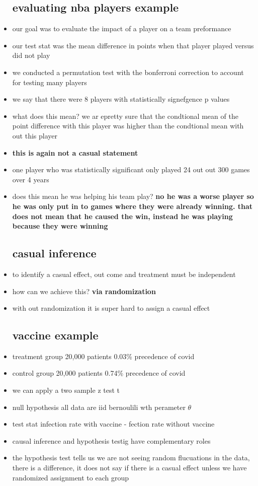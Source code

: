 \documentclass{article}
\begin{document}
\begin{itemize}
\subsection*{evaluating nba players example}
\item our goal was to evaluate the impact of a player on a team preformance
\item our test stat was the mean difference in points when that player played versus did not play 
\item we conducted a permutation test with the bonferroni correction to account for testing many players
\item we say that there were 8 players with statistically signefgence p values
\item what does this mean? we ar epretty sure that the condtional mean of the point difference with this player was higher than the condtional mean with out this player
\item \textbf{this is again not a casual statement}
\item one player  who was statistically significant  only played 24 out out 300 games over 4 years 
\item does this mean he was helping his team play? \textbf{no he was a worse player so he was only put in to games where they were already winning. that does not mean that he caused the win, instead he was playing because they were winning  
}
\subsection*{casual inference
}
\item to identify a casual effect, out come and treatment must be independent
\item how can we achieve this? \textbf{via randomization}
\item with out randomization it is super hard to assign a casual effect 

\subsection*{vaccine example}
\item treatment group 20,000 patients 0.03\% precedence of covid 
\item control group 20,000 patients 0.74\% precedence of covid 
\item we can apply a two sample z test t
\item null hypothesis all data are iid bernoulili wth perameter $\theta$
\item test stat infection rate with vaccine - fection rate without vaccine 
\item causal inference and hypothesis testig have complementary roles 
\item the hypothesis test tells us we are not seeing random flucuations in the data, there is a difference, it does not say if there is a casual effect unless we have randomized assignment to each group

\end{itemize}
\end{document}
